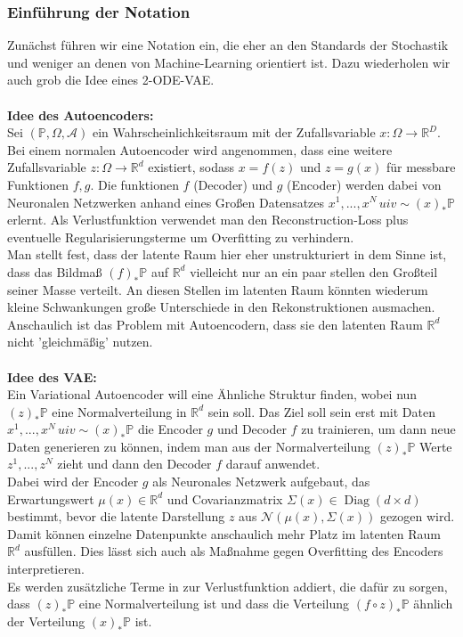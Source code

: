 \documentclass[12pt]{article}
\newcommand{\R}{\mathbb{R}}
\newcommand{\bP}{\mathbb{P}}
\begin{document}
	\newpage
	\subsubsection[Notation]{Einführung der Notation}
	Zunächst führen wir eine Notation ein, die eher an den Standards der Stochastik und weniger an denen von Machine-Learning orientiert ist. Dazu wiederholen wir auch grob die Idee eines 2-ODE-VAE.\\
	\\
	\textbf{Idee des Autoencoders:}\\
	Sei $(\bP,\Omega,\mathcal{A})$ ein Wahrscheinlichkeitsraum mit der Zufallsvariable $x : \Omega \rightarrow \R^D$. Bei einem normalen Autoencoder wird angenommen, dass eine weitere Zufallsvariable $z: \Omega \rightarrow \R^d$ existiert, sodass $x = f(z)$ und $z = g(x)$ für messbare Funktionen $f,g$. Die funktionen $f$ (Decoder) und $g$ (Encoder) werden dabei von Neuronalen Netzwerken anhand eines Großen Datensatzes $x^1,...,x^N \, uiv \sim (x)_*\bP$ erlernt. Als Verlustfunktion verwendet man den Reconstruction-Loss plus eventuelle Regularisierungsterme um Overfitting zu verhindern.\\
	Man stellt fest, dass der latente Raum hier eher unstrukturiert in dem Sinne ist, dass das Bildmaß $(f)_*\bP$ auf $\R^d$ vielleicht nur an ein paar stellen den Großteil seiner Masse verteilt. An diesen Stellen im latenten Raum könnten wiederum kleine Schwankungen große Unterschiede in den Rekonstruktionen ausmachen. Anschaulich ist das Problem mit Autoencodern, dass sie den latenten Raum $\R^d$ nicht 'gleichmäßig' nutzen.\\
	\\
	\textbf{Idee des VAE:}\\
	Ein Variational Autoencoder will eine Ähnliche Struktur finden, wobei nun $(z)_*\bP$ eine Normalverteilung in $\R^d$ sein soll. Das Ziel soll sein erst mit Daten $x^1,...,x^N \, uiv \sim (x)_*\bP$ die Encoder $g$ und Decoder $f$ zu trainieren, um dann neue Daten generieren zu können, indem man aus der Normalverteilung $(z)_*\bP$ Werte $z^1,...,z^N$ zieht und dann den Decoder $f$ darauf anwendet.\\
	Dabei wird der Encoder $g$ als Neuronales Netzwerk aufgebaut, das Erwartungswert $\mu(x) \in \R^d$ und Covarianzmatrix $\Sigma(x) \in \operatorname{Diag}(d\times d)$ bestimmt, bevor die latente Darstellung $z$ aus $\mathcal{N}\left(\mu(x),\Sigma(x)\right)$ gezogen wird. Damit können einzelne Datenpunkte anschaulich mehr Platz im latenten Raum $\R^d$ ausfüllen. Dies lässt sich auch als Maßnahme gegen Overfitting des Encoders interpretieren.\\ Es werden zusätzliche Terme in zur Verlustfunktion addiert, die dafür zu sorgen, dass $(z)_*\bP$ eine Normalverteilung ist und dass die Verteilung $(f \circ z)_*\bP$ ähnlich der Verteilung $(x)_*\bP$ ist.
\end{document}

